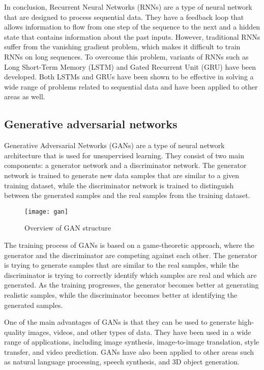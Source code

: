 In conclusion, Recurrent Neural Networks (RNNs) are a type of neural network that are designed to process sequential data.
They have a feedback loop that allows information to flow from one step of the sequence to the next and a hidden state that contains information about the past inputs.
However, traditional RNNs suffer from the vanishing gradient problem, which makes it difficult to train RNNs on long sequences.
To overcome this problem, variants of RNNs such as Long Short-Term Memory (LSTM) and Gated Recurrent Unit (GRU) have been developed. Both LSTMs and GRUs have been shown to be effective in solving a wide range of problems related to sequential data and have been applied to other areas as well.

\subsection{Generative adversarial networks}
Generative Adversarial Networks (GANs) \cite{goodfellow2014generative, mirza2014conditional} are a type of neural network architecture that is used for unsupervised learning.
They consist of two main components: a generator network and a discriminator network.
The generator network is trained to generate new data samples that are similar to a given training dataset, while the discriminator network is trained to distinguish between the generated samples and the real samples from the training dataset.

\begin{figure}[H]
  \centering
  \texttt{[image: gan]}
  \caption{Overview of GAN structure \cite{googledevelopers}}
\end{figure}

The training process of GANs is based on a game-theoretic approach, where the generator and the discriminator are competing against each other.
The generator is trying to generate samples that are similar to the real samples, while the discriminator is trying to correctly identify which samples are real and which are generated.
As the training progresses, the generator becomes better at generating realistic samples, while the discriminator becomes better at identifying the generated samples.

One of the main advantages of GANs is that they can be used to generate high-quality images, videos, and other types of data.
They have been used in a wide range of applications, including image synthesis, image-to-image translation, style transfer, and video prediction. 
GANs have also been applied to other areas such as natural language processing, speech synthesis, and 3D object generation.

